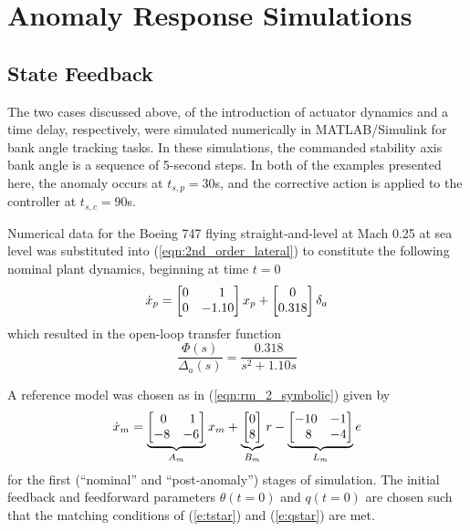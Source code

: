 \chapter{Anomaly Response Simulations}  \label{ch:numerical}
\section{State Feedback}
The two cases discussed above, of the introduction of actuator dynamics and a time delay, respectively, were simulated numerically in MATLAB/Simulink for bank angle tracking tasks. In these simulations, the commanded stability axis bank angle is a sequence of 5-second steps. In both of the examples presented here, the anomaly occurs at $t_{s,p} = 30$s, and the corrective action is applied to the controller at $t_{s,c} = 90$s.

Numerical data for the Boeing 747 flying straight-and-level at Mach 0.25 at sea level \cite{heffley1972aircraft} was substituted into (\ref{eqn:2nd_order_lateral}) to constitute the following nominal plant dynamics, beginning at time $t = 0$
\begin{equation}
		\dot{x}_p = \begin{bmatrix}
			0 & \hfil 1 \\ 0 & -1.10
		\end{bmatrix} x_p + \begin{bmatrix}
			0 \\ 0.318
		\end{bmatrix} \delta_a
\end{equation} \noindent which resulted in the open-loop transfer function 
\begin{equation}
		\frac{\Phi(s)}{\Delta_a(s)} = \frac{0.318}{s^2 + 1.10s}
\end{equation}

A reference model was chosen as in (\ref{eqn:rm_2_symbolic}) given by
\begin{equation}
	\dot{x}_m = \underbrace{\begin{bmatrix}
		\hfil 0 & \hfil 1\\ -8 & -6
	\end{bmatrix}}_{A_m} x_m + \underbrace{\begin{bmatrix}
		0 \\ 8
	\end{bmatrix}}_{B_m} r - \underbrace{\begin{bmatrix}
		\hfil -10 & \hfil -1 \\ \hfil 8 & \hfil -4
	\end{bmatrix}}_{L_m} e
	\label{eqn:rm_2}
\end{equation}
\noindent for the first (``nominal'' and ``post-anomaly'') stages of simulation. The initial feedback and feedforward parameters $\theta(t=0)$ and $q(t=0)$ are chosen such that the matching conditions of (\ref{e:tstar}) and (\ref{e:qstar}) are met.

